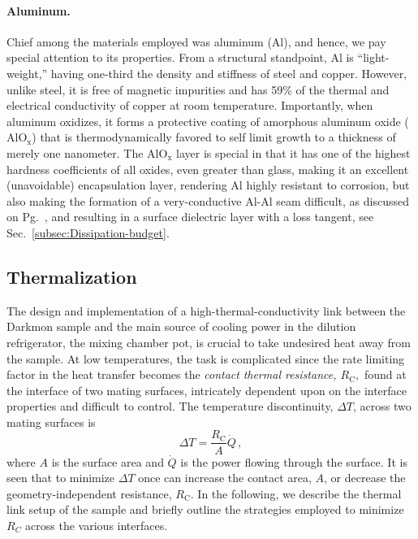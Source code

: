 \paragraph{Aluminum. }

Chief among the materials employed was aluminum (Al), and hence, we
pay special attention to its properties. From a structural standpoint,
Al is ``light-weight,'' having one-third the density and stiffness
of steel and copper. However, unlike steel, it is free of magnetic
impurities and has 59\% of the thermal and electrical conductivity
of copper at room temperature. Importantly, when aluminum oxidizes,
it forms a protective coating of amorphous aluminum oxide ($\mathrm{AlO_{x}}$)
that is thermodynamically favored to self limit growth to a thickness
of merely one nanometer. The $\mathrm{AlO_{x}}$ layer is special
in that it has one of the highest hardness coefficients of all oxides,
even greater than glass, making it an excellent (unavoidable) encapsulation
layer, rendering Al highly resistant to corrosion, but also making
the formation of a very-conductive Al-Al seam difficult, as discussed
on Pg.~\pageref{disc:Seam-quality}, and resulting in a surface dielectric
layer with a loss tangent, see Sec.~\ref{subsec:Dissipation-budget}.


\subsection{Thermalization}

The design and implementation of a high-thermal-conductivity link
between the Darkmon sample and the main source of cooling power in
the dilution refrigerator, the mixing chamber pot, is crucial to take
undesired heat away from the sample. At low temperatures, the task
is complicated since the rate limiting factor in the heat transfer
becomes the \emph{contact} \emph{thermal resistance, $R_{\mathrm{C}},$}
found at the interface of two mating surfaces, intricately dependent
upon on the interface properties and difficult to control. The temperature
discontinuity, $\Delta T$, across two mating surfaces is 
\begin{equation}
\Delta T=\frac{R_{\mathrm{C}}}{A}\dot{Q}\,,
\end{equation}
where $A$ is the surface area and $\dot{Q}$ is the power flowing
through the surface. It is seen that to minimize $\Delta T$ once
can increase the contact area, $A$, or decrease the geometry-independent
resistance, $R_{\mathrm{C}}.$ In the following, we describe the thermal
link setup of the sample and briefly outline the strategies employed
to minimize $R_{C}$ across the various interfaces.

